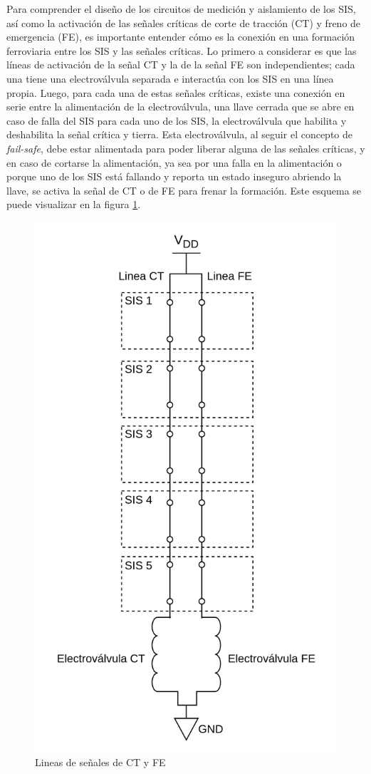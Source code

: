 Para comprender el diseño de los circuitos de medición y aislamiento de los SIS, así como la activación de las señales críticas de corte de tracción (CT) y freno de emergencia (FE), es importante entender cómo es la conexión en una formación ferroviaria entre los SIS y las señales críticas. Lo primero a considerar es que las líneas de activación de la señal CT y la de la señal FE son independientes; cada una tiene una electroválvula separada e interactúa con los SIS en una línea propia. Luego, para cada una de estas señales críticas, existe una conexión en serie entre la alimentación de la electroválvula, una llave cerrada que se abre en caso de falla del SIS para cada uno de los SIS, la electroválvula que habilita y deshabilita la señal crítica y tierra. Esta electroválvula, al seguir el concepto de \textit{fail-safe}, debe estar alimentada para poder liberar alguna de las señales críticas, y en caso de cortarse la alimentación, ya sea por una falla en la alimentación o porque uno de los SIS está fallando y reporta un estado inseguro abriendo la llave, se activa la señal de CT o de FE para frenar la formación. Este esquema se puede visualizar en la figura \ref{fig:lineas_ct_fe}.\\


\begin{figure}[H]
    \centering
    \includegraphics[width =  0.5\linewidth]{img/lineas_ct_fe.png}
    \caption{Lineas de señales de CT y FE}
    \label{fig:lineas_ct_fe}
\end{figure}


